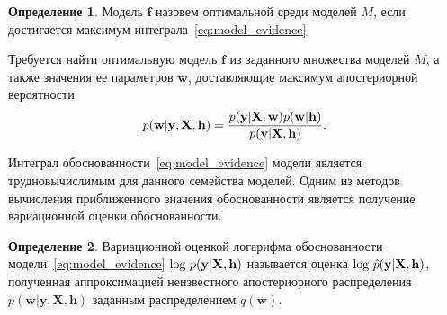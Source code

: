 \documentclass[11pt, a5paper]{dissert}
\theoremstyle{definition}
\newtheorem{defin}{Определение}
\begin{document}
\begin{defin}Модель  $\mathbf{f}$ назовем оптимальной среди моделей $M$, если достигается максимум интеграла~\eqref{eq:model_evidence}.
\end{defin}

Требуется найти оптимальную модель $\mathbf{f}$ из заданного множества моделей $M$, а также значения ее параметров $\mathbf{w}$, доставляющие максимум апостериорной вероятности
\begin{equation}
\label{eq:var_inf_posterior}
	p(\mathbf{w}|\mathbf{y},\mathbf{X},\mathbf{h}) = \frac{p(\mathbf{y}|\mathbf{X},\mathbf{w})p(\mathbf{w}|\mathbf{h})}{p(\mathbf{y}|\mathbf{X}, \mathbf{h})}.
\end{equation}

Интеграл обоснованности~\eqref{eq:model_evidence} модели является трудновычислимым для данного семейства моделей. Одним из методов вычисления приближенного значения обоснованности является получение вариационной оценки обоснованности.  

{
\begin{defin} Вариационной оценкой логарифма обоснованности модели~\eqref{eq:model_evidence} $\textnormal{log}~p(\mathbf{y}|\mathbf{X},\mathbf{h})$ называется оценка $\textnormal{log}~\hat{p}(\mathbf{y}|\mathbf{X},\mathbf{h})$, полученная аппроксимацией неизвестного апостериорного распределения $p(\mathbf{w}| \mathbf{y}, \mathbf{X}, \mathbf{h})$ заданным распределением $q(\mathbf{w})$.
\end{defin}
}
\end{document}
